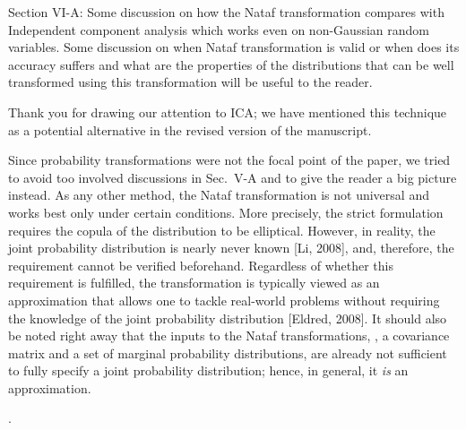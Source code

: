 \begin{reviewer}
Section VI-A:  Some discussion on how the Nataf transformation compares with Independent component analysis which works even on non-Gaussian random variables. Some discussion on when Nataf transformation is valid or when does its accuracy suffers and what are the properties of the distributions that can be well transformed using this transformation will be useful to the reader.
\end{reviewer}
\begin{authors}
Thank you for drawing our attention to ICA; we have mentioned this technique as a potential alternative in the revised version of the manuscript.

Since probability transformations were not the focal point of the paper, we tried to avoid too involved discussions in Sec.~V-A and to give the reader a big picture instead.
As any other method, the Nataf transformation is not universal and works best only under certain conditions.
More precisely, the strict formulation requires the copula of the distribution to be elliptical.
However, in reality, the joint probability distribution is nearly never known [Li, 2008], and, therefore, the requirement cannot be verified beforehand.
Regardless of whether this requirement is fulfilled, the transformation is typically viewed as an approximation that allows one to tackle real-world problems without requiring the knowledge of the joint probability distribution [Eldred, 2008].
It should also be noted right away that the inputs to the Nataf transformations, \ie, a covariance matrix and a set of marginal probability distributions, are already not sufficient to fully specify a joint probability distribution; hence, in general, it \emph{is} an approximation.

\begin{actions}
  .
\end{actions}
\end{authors}

